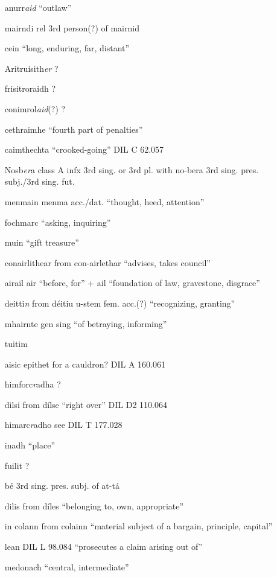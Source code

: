 \documentclass[11pt]{article}
\begin{document}
\begin{enumerate}
  \item[anurr\emph{aid}] \enquote{outlaw}
  \item[mairndi] rel 3rd person(?) of mairnid
  \item[cein] \enquote{long, enduring, far, distant} 
  \item[Aritruisith\emph{er}] ?
  \item[frisitroraidh] ? 
  \item[conimrol\emph{aid}(?)] ?
  \item[cethraimhe] \enquote{fourth part of penalties}
  \item[caimthechta] \enquote{crooked-going} DIL C 62.057
  \item[Nosb\emph{er}a] class A infx 3rd sing. or 3rd pl. with no-bera 3rd sing. pres. subj./3rd sing. fut.
  \item[menmain] menma acc./dat. \enquote{thought, heed, attention}
  \item[fochmarc] \enquote{asking, inquiring}
  \item[muin] \enquote{gift treasure}
  \item[conairlithear] from con-airlethar \enquote{advises, takes council}
  \item[airail] air \enquote{before, for} + ail \enquote{foundation of law, gravestone, disgrace}
  \item[deitti\emph{n}] from d\'{e}itiu u-stem fem. acc.(?) \enquote{recognizing, granting}
  \item[mhairnte] gen sing \enquote{of betraying, informing}
  \item[tuitim]
  \item[aisic] epithet for a cauldron? DIL A 160.061
  \item[himforc\emph{r}adha] ?
  \item[dilsi] from d\'{i}lse \enquote{right over} DIL D2 110.064
  \item[himarc\emph{r}adho] see DIL T 177.028
  \item[inadh] \enquote{place}
  \item[fuilit] ?
  \item[b\'{e}] 3rd sing. pres. subj. of at-t\'{a}
  \item[dilis] from d\'{i}les \enquote{belonging to, own, appropriate}
  \item[in colann] from colainn \enquote{material subject of a bargain, principle, capital}
  \item[lean] DIL L 98.084 \enquote{prosecutes a claim arising out of}
  \item[medonach] \enquote{central, intermediate}

\end{enumerate}
\end{document}
